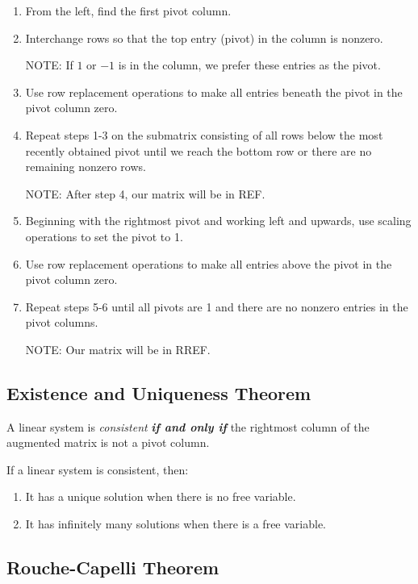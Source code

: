 \documentclass[12pt, letterpaper]{article}
\begin{document}
\begin{enumerate}
  \item From the left, find the first pivot column.
  \item Interchange rows so that the top entry (pivot) in the column is nonzero.

    NOTE: If $ 1 $ or $ -1 $ is in the column, we prefer these
    entries as the pivot.
  \item Use row replacement operations to make all entries beneath
    the pivot in the pivot column zero.
  \item Repeat steps 1-3 on the submatrix consisting of all rows
    below the most recently obtained pivot until we reach the bottom
    row or there are no remaining nonzero rows.

    NOTE: After step 4, our matrix will be in REF.
  \item Beginning with the rightmost pivot and working left and
    upwards, use scaling operations to set the pivot to 1.
  \item Use row replacement operations to make all entries above the
    pivot in the pivot column zero.
  \item Repeat steps 5-6 until all pivots are 1 and there are no
    nonzero entries in the pivot columns.

    NOTE: Our matrix will be in RREF.
\end{enumerate}

\subsection*{Existence and Uniqueness Theorem}

A linear system is \textit{consistent} \textit{\textbf{if and only
if}} the rightmost column of the augmented matrix is not a pivot column.

If a linear system is consistent, then:

\begin{enumerate}
  \item It has a unique solution when there is no free variable.
  \item It has infinitely many solutions when there is a free variable.
\end{enumerate}


\subsection*{Rouche-Capelli Theorem}
\end{document}
